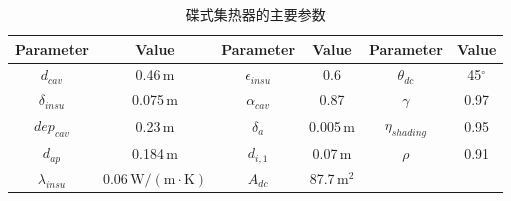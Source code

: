 \begin{table}[htbp]
	\caption{碟式集热器的主要参数}
	\begin{center}
	\begin{tabular}{cccccc}
		\toprule
		Parameter		&	Value	&	Parameter		&	Value	&	Parameter		&	Value\\
		\midrule
		$d_{cav}$	&	0.46$\,\mathrm{m}$	&	$\epsilon_{insu}$	&	0.6	&	$\theta_{dc}$	&	45$^\circ$\\
		$\delta_{insu}$	&	0.075$\,\mathrm{m}$	&	$\alpha_{cav}$	&	0.87	&	$\gamma$	&	0.97\\
		$dep_{cav}$	&	0.23$\,\mathrm{m}$	&	$\delta_a$		&	0.005$\,\mathrm{m}$	&	$\eta_{shading}$	&	0.95\\
		$d_{ap}$	&	0.184$\,\mathrm{m}$	&	$d_{i,1}$	&	0.07$\,\mathrm{m}$	&	$\rho$	&	0.91\\
		$\lambda_{insu}$	&	0.06$\,\mathrm{W/(m\cdot K)}$	&	$A_{dc}$	&	87.7$\,\mathrm{m^2}$	&	\\		
		\bottomrule
	\end{tabular}
	\end{center}
	\label{tab:dc}
\end{table}


